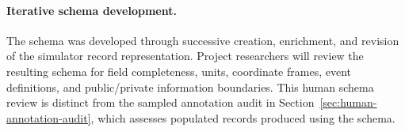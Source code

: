 \paragraph{Iterative schema development.}
The schema was developed through successive creation, enrichment, and
revision of the simulator record representation. Project researchers will
review the resulting schema for field completeness, units, coordinate
frames, event definitions, and public/private information boundaries.
This human schema review is distinct from the sampled annotation audit
in Section~\ref{sec:human-annotation-audit}, which assesses populated
records produced using the schema.
